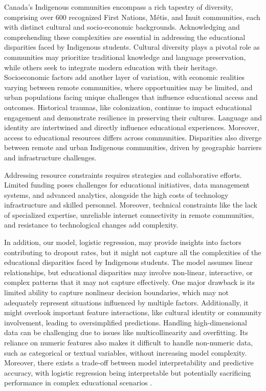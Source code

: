 \documentclass[final,12p,twocolumn]{article}
\begin{document}
Canada's Indigenous communities encompass a rich tapestry of diversity, comprising over 600 recognized First Nations, Métis, and Inuit communities, each with distinct cultural and socio-economic backgrounds. Acknowledging and comprehending these complexities are essential in addressing the educational disparities faced by Indigenous students. Cultural diversity plays a pivotal role as communities may prioritize traditional knowledge and language preservation, while others seek to integrate modern education with their heritage. Socioeconomic factors add another layer of variation, with economic realities varying between remote communities, where opportunities may be limited, and urban populations facing unique challenges that influence educational access and outcomes. Historical traumas, like colonization, continue to impact educational engagement and demonstrate resilience in preserving their cultures. Language and identity are intertwined and directly influence educational experiences. Moreover, access to educational resources differs across communities. Disparities also diverge between remote and urban Indigenous communities, driven by geographic barriers and infrastructure challenges.

Addressing resource constraints requires strategies and collaborative efforts. Limited funding poses challenges for educational initiatives, data management systems, and advanced analytics, alongside the high costs of technology infrastructure and skilled personnel. Moreover, technical constraints like the lack of specialized expertise, unreliable internet connectivity in remote communities, and resistance to technological changes add complexity.

In addition, our model, logistic regression, may provide insights into factors contributing to dropout rates, but it might not capture all the complexities of the educational disparities faced by Indigenous students. The model assumes linear relationships, but educational disparities may involve non-linear, interactive, or complex patterns that it may not capture effectively. One major drawback is its limited ability to capture nonlinear decision boundaries, which may not adequately represent situations influenced by multiple factors. Additionally, it might overlook important feature interactions, like cultural identity or community involvement, leading to oversimplified predictions. Handling high-dimensional data can be challenging due to issues like multicollinearity and overfitting. Its reliance on numeric features also makes it difficult to handle non-numeric data, such as categorical or textual variables, without increasing model complexity. Moreover, there exists a trade-off between model interpretability and predictive accuracy, with logistic regression being interpretable but potentially sacrificing performance in complex educational scenarios \cite{r20}.
\end{document}
